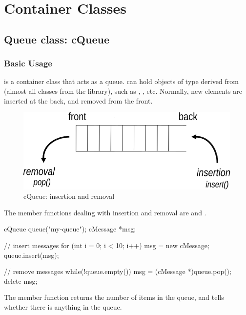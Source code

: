 \section{Container Classes}

\subsection{Queue class: cQueue}

\subsubsection{Basic Usage}

 is a container class that acts as a queue.
 can hold objects of type derived from 
(almost all classes from the {\opp} library), such as
, , etc. Normally, new elements
are inserted at the back, and removed from the front.

\begin{figure}[htbp]
  \begin{center}
    \includegraphics[scale=0.8]{figures/simlib-queue}
    \caption{cQueue: insertion and removal}
    \label{fig:ch-sim-lib:cqueue}
  \end{center}
\end{figure}

The member functions dealing with insertion and removal are
 and .

\begin{cpp}
cQueue queue("my-queue");
cMessage *msg;

// insert messages
for (int i = 0; i < 10; i++) {
    msg = new cMessage;
    queue.insert(msg);
}

// remove messages
while(!queue.empty()) {
    msg = (cMessage *)queue.pop();
    delete msg;
}
\end{cpp}

The  member function returns the number of items in the
queue, and  tells whether there is anything in the queue.

